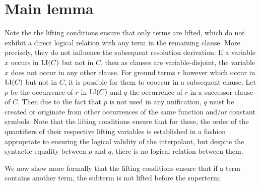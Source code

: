 



\section{Main lemma}
Note the the lifting conditions ensure that only terms are lifted,
which do not exhibit a direct logical relation with any term in the remaining clause.
More precisely, they do not influence the subsequent resolution derivation: 
If a variable $x$ occurs in $\operatorname{LI}(C)$ but not in $C$, then as clauses are variable-disjoint, the variable $x$ does not occur in any other clause.
For ground terms $r$ however which occur in $\operatorname{LI}(C)$ but not in $C$,
it is possible for them to cooccur in a subsequent clause. Let $p$ be the occurrence of $r$ in $\operatorname{LI}(C)$ and $q$ the occurrence of $r$ in a successor-clause of $C$.
Then due to the fact that $p$ is not used in any unification, 
$q$ must be created or originate from other occurrences of the same function and/or constant symbols.
Note that the lifting conditions ensure that for these, the order of the quantifiers of their respective lifting variables is established in a fashion appropriate to ensuring the logical validity of the interpolant, but despite the syntactic equality between $p$ and $q$, there is no logical relation between them.

We now show more formally that the lifting conditions ensure that if a term contains another term, the subterm is not lifted before the superterm:

